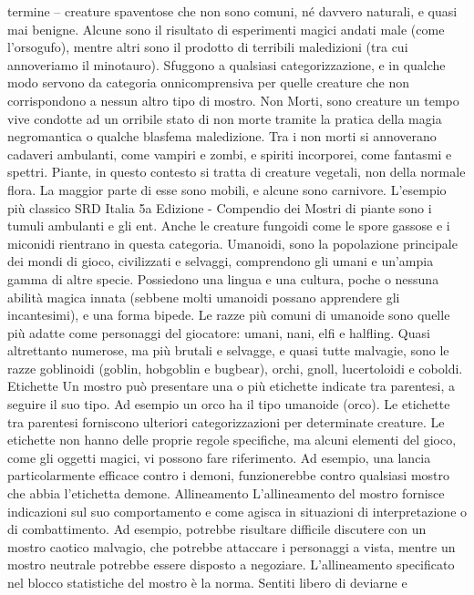 \begin{multicols}{2}
termine – creature spaventose che non sono comuni,
né davvero naturali, e quasi mai benigne. Alcune sono
il risultato di esperimenti magici andati male (come
l’orsogufo), mentre altri sono il prodotto di terribili
maledizioni (tra cui annoveriamo il minotauro).
Sfuggono a qualsiasi categorizzazione, e in qualche
modo servono da categoria onnicomprensiva per quelle
creature che non corrispondono a nessun altro tipo di
mostro.
Non Morti, sono creature un tempo vive condotte ad un
orribile stato di non morte tramite la pratica della magia
negromantica o qualche blasfema maledizione. Tra i
non morti si annoverano cadaveri ambulanti, come
vampiri e zombi, e spiriti incorporei, come fantasmi e
spettri.
Piante, in questo contesto si tratta di creature vegetali,
non della normale flora. La maggior parte di esse sono
mobili, e alcune sono carnivore. L’esempio più classico 
SRD Italia 5a Edizione - Compendio dei Mostri
di piante sono i tumuli ambulanti e gli ent. Anche le
creature fungoidi come le spore gassose e i miconidi
rientrano in questa categoria.
Umanoidi, sono la popolazione principale dei mondi di
gioco, civilizzati e selvaggi, comprendono gli umani e
un’ampia gamma di altre specie. Possiedono una
lingua e una cultura, poche o nessuna abilità magica
innata (sebbene molti umanoidi possano apprendere gli
incantesimi), e una forma bipede. Le razze più comuni
di umanoide sono quelle più adatte come personaggi
del giocatore: umani, nani, elfi e halfling. Quasi
altrettanto numerose, ma più brutali e selvagge, e quasi
tutte malvagie, sono le razze goblinoidi (goblin,
hobgoblin e bugbear), orchi, gnoll, lucertoloidi e coboldi.
Etichette
Un mostro può presentare una o più etichette indicate
tra parentesi, a seguire il suo tipo. Ad esempio un orco
ha il tipo umanoide (orco). Le etichette tra parentesi
forniscono ulteriori categorizzazioni per determinate
creature. Le etichette non hanno delle proprie regole
specifiche, ma alcuni elementi del gioco, come gli
oggetti magici, vi possono fare riferimento. Ad esempio,
una lancia particolarmente efficace contro i demoni,
funzionerebbe contro qualsiasi mostro che abbia
l’etichetta demone.
Allineamento
L’allineamento del mostro fornisce indicazioni sul suo
comportamento e come agisca in situazioni di
interpretazione o di combattimento. Ad esempio,
potrebbe risultare difficile discutere con un mostro
caotico malvagio, che potrebbe attaccare i personaggi
a vista, mentre un mostro neutrale potrebbe essere
disposto a negoziare.
L’allineamento specificato nel blocco statistiche del
mostro è la norma. Sentiti libero di deviarne e

\end{multicols}
